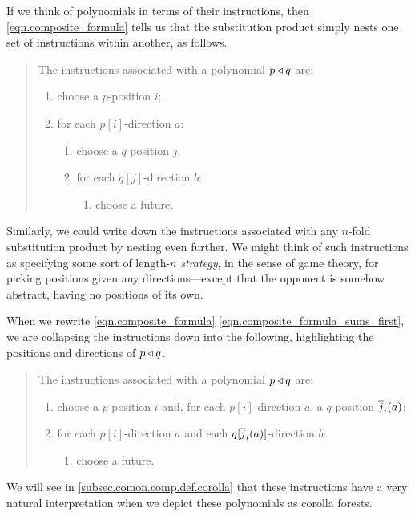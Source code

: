 \documentclass[Book-Poly]{subfiles}
\begin{document}
If we think of polynomials in terms of their instructions, then \eqref{eqn.composite_formula} tells us that the substitution product simply nests one set of instructions within another, as follows.
\begin{quote}
The instructions associated with a polynomial $p\mathbin{\triangleleft} q$ are:
\begin{enumerate}
    \item choose a $p$-position $i$;
    \item for each $p[i]$-direction $a$:
    \begin{enumerate}[label*=\arabic*.]
        \item choose a $q$-position $j$;
        \item for each $q[j]$-direction $b$:
        \begin{enumerate}[label*=\arabic*.]
            \item choose a future.
        \end{enumerate}
    \end{enumerate}
\end{enumerate}
\end{quote}
Similarly, we could write down the instructions associated with any $n$-fold substitution product by nesting even further.
We might think of such instructions as specifying some sort of length-$n$ \emph{strategy}, in the sense of game theory, for picking positions given any directions---except that the opponent is somehow abstract, having no positions of its own.

When we rewrite \eqref{eqn.composite_formula} \eqref{eqn.composite_formula_sums_first}, we are collapsing the instructions down into the following, highlighting the positions and directions of $p\mathbin{\triangleleft} q$.
\begin{quote}
The instructions associated with a polynomial $p\mathbin{\triangleleft} q$ are:
\begin{enumerate}
    \item choose a $p$-position $i$ and, for each $p[i]$-direction $a$, a $q$-position $\overline{j}_i(a)$;
    \item for each $p[i]$-direction $a$ and each $q[\overline{j}_i(a)]$-direction $b$:
    \begin{enumerate}[label*=\arabic*.]
        \item choose a future.
    \end{enumerate}
\end{enumerate}
\end{quote}
We will see in \cref{subsec.comon.comp.def.corolla} that these instructions have a very natural interpretation when we depict these polynomials as corolla forests.
\end{document}
